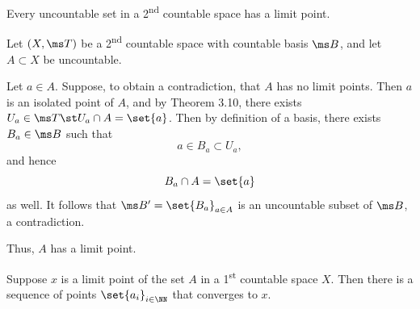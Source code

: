 \documentclass{fkpset}
\begin{document}
  \begin{problem}[6.11]
    Every uncountable set in a 2\textsuperscript{nd} countable space
    has a limit point.
  \end{problem}
  \begin{solution}
    Let $(X, \ms T)$ be a 2\textsuperscript{nd} countable space with
    countable basis $\ms B$, and let $A \subset X$ be uncountable.

    Let $a \in A$. Suppose, to obtain a contradiction, that $A$ has no
    limit points. Then $a$ is an isolated point of $A$, and by Theorem
    3.10, there exists $U_a \in \ms T \st U_a \cap A = \set{a}$. Then
    by definition of a basis, there exists $B_a \in \ms B$ such that
    \[
      a \in B_a \subset U_a,
    \]
    and hence
    \[
      B_a \cap A = \set{a}
    \]
    as well. It follows that $\ms B' = \set{B_a}_{a \in A}$ is an
    uncountable subset of $\ms B$, a contradiction.

    Thus, $A$ has a limit point.
  \end{solution}
  \clearpage

  \begin{problem}[6.18]
    Suppose $x$ is a limit point of the set $A$ in a
    1\textsuperscript{st} countable space $X$. Then there is a
    sequence of points $\set{a_i}_{i \in \NN}$ that converges to $x$.
  \end{problem}
  \begin{solution}
  \end{solution}
\end{document}
